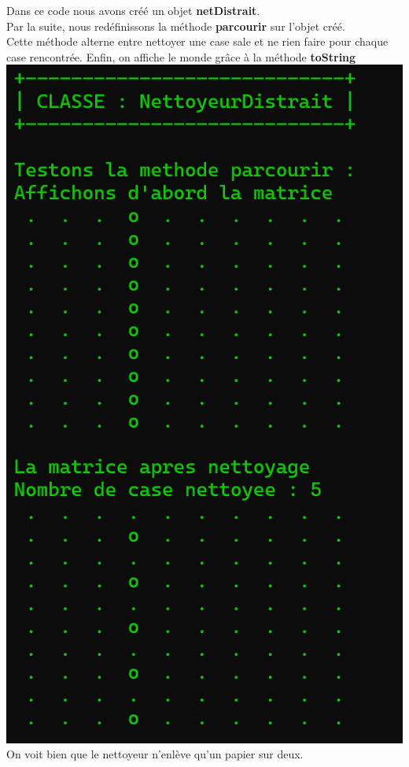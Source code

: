 \documentclass{article}
\begin{document}
Dans ce code nous avons créé un objet \textbf{netDistrait}.\\
Par la suite, nous redéfinissons la méthode \textbf{parcourir} sur l'objet créé.\\ Cette méthode alterne entre nettoyer une case sale et ne rien faire pour chaque case rencontrée.
Enfin, on affiche le monde grâce à la méthode \textbf{toString}\\

\includegraphics[scale=0.7]{../images/exo7.png}\\
On voit bien que le nettoyeur n'enlève qu’un papier	sur	deux.
\end{document}
